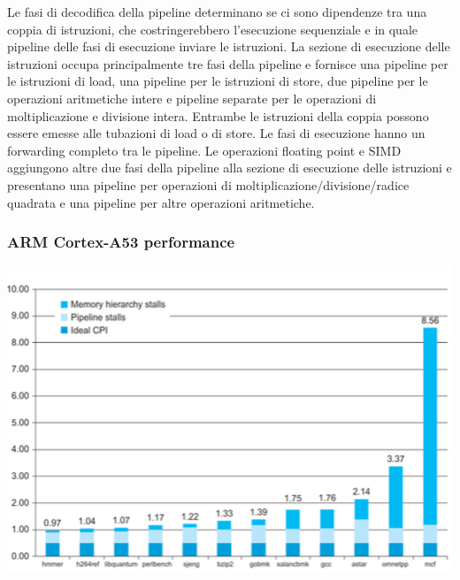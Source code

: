 \documentclass[12pt,a4paper]{article}
\begin{document}
Le fasi di decodifica della pipeline determinano se ci sono dipendenze tra una coppia di istruzioni, che costringerebbero l'esecuzione sequenziale e in quale pipeline delle fasi di esecuzione inviare le istruzioni. La sezione di esecuzione delle istruzioni occupa principalmente tre fasi della pipeline e fornisce una pipeline per le istruzioni di load, una pipeline per le istruzioni di store, due pipeline per le operazioni aritmetiche intere e pipeline separate per le operazioni di moltiplicazione e divisione intera. Entrambe le istruzioni della coppia possono essere emesse alle tubazioni di load o di store. Le fasi di esecuzione hanno un forwarding completo tra le pipeline. Le operazioni floating point e SIMD aggiungono altre due fasi della pipeline alla sezione di esecuzione delle istruzioni e presentano una pipeline per operazioni di moltiplicazione/divisione/radice quadrata e una pipeline per altre operazioni aritmetiche.
\subsubsection{ARM Cortex-A53 performance}
\begin{center}
\includegraphics[width=0.6\columnwidth]{img/cortex_performance.png}
\end{center}
\end{document}

